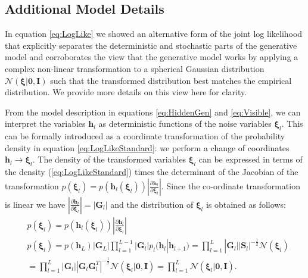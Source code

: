\documentclass{article}
\newcommand{\hid}{\ensuremath{\mathbf{h}}} %
\newcommand{\N}{\mathcal{N}} %
\newcommand{\myvec}[1]{\mbox{$\mathbf{#1}$}}
\newcommand{\myvecsym}[1]{\mbox{$\boldsymbol{#1}$}}
\newcommand{\vzero}{\mbox{$\myvecsym{0}$}}
\newcommand{\vxi}{\mbox{$\myvecsym{\xi}$}}
\newcommand{\vG}{\mbox{$\myvec{G}$}}
\newcommand{\vI}{\mbox{$\myvec{I}$}}
\newcommand{\vS}{\mbox{$\myvec{S}$}}
\begin{document}
\clearpage
\normalsize
\begin{bibunit}[icml2013]


\appendix

\section{Additional Model Details}
\label{app:altView}
In equation \eqref{eq:LogLike} we showed an alternative form of the joint 
log likelihood that explicitly separates the 
deterministic and stochastic parts of the generative model and corroborates 
the view that the generative model works by 
applying a complex non-linear transformation to a spherical Gaussian 
distribution $\N(\vxi| \vzero, \vI)$ such that the transformed distribution 
best 
matches the empirical distribution. We provide more details on this view 
here for clarity.

From the model description in equations \eqref{eq:HiddenGen} and 
\eqref{eq:Visible}, we can interpret the variables $\hid_l$ as deterministic 
functions of the noise variables $\vxi_l$.  This can be formally introduced 
as a coordinate transformation of the probability density in equation 
\eqref{eq:LogLikeStandard}: we perform a change of coordinates $\hid_l 
\rightarrow \vxi_{l}$. The density of the transformed variables 
$\vxi_l$ can be expressed in terms of the density (\ref{eq:LogLikeStandard}) 
times the determinant of the Jacobian of the transformation $p(\vxi_l)  = 
p(\hid_l(\vxi_l)) 
|\frac{\partial \hid_l}{\partial \vxi_l}| $. Since the co-ordinate transformation is 
linear we have $|\frac{\partial \hid_l}{\partial \vxi_l}| = |\vG_l|$ and the distribution 
of $\vxi_l$ is obtained as follows:
\begin{align}
&p(\vxi_l)\!\!  = 
p(\hid_l(\vxi_l)) 
|\frac{\partial \hid_l}{\partial \vxi_l}| \nonumber \\
& p(\vxi_l)\!\! = \! p(\hid_L) \! |\vG_L| \!
\prod_{l=1}^{L - 1} \!  |\!\vG_l\!| p_l( \hid_l | \hid_{l+1}\! ) 
\! = \!\! \prod_{l=1}^{L} \! |\vG_l| |\vS_l|^{-\frac{1}{2}}  \N( \vxi_l ) 
\nonumber \\
&=  \prod_{l=1}^{L}  |\vG_l| |\vG_l \vG_l^T|^{-\frac{1}{2}} \N( \vxi_l | 
\vzero, \vI) = 
\prod_{l=1}^{L} \N\!( \vxi_l | \vzero, \vI).
\end{align}


\end{bibunit}
\end{document}

